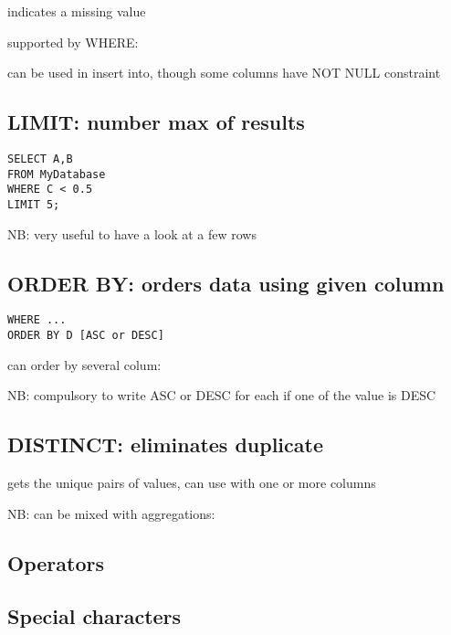 		 indicates a missing value

		supported by WHERE: 

		can be used in insert into, though some  columns have NOT NULL constraint

		\subsection{LIMIT: number max of results}

\begin{lstlisting}
SELECT A,B
FROM MyDatabase
WHERE C < 0.5
LIMIT 5;
\end{lstlisting}

	NB: very useful to have a look at a few rows

	\subsection{ORDER BY: orders data using given column}

\begin{lstlisting}
WHERE ...
ORDER BY D [ASC or DESC]
\end{lstlisting}

		can  order by several colum: 

		NB: compulsory to write ASC  or DESC for each if one of the value is DESC

	\subsection{DISTINCT: eliminates duplicate}

		 gets the unique pairs of values, can use with one or more columns
		
		NB: can be mixed with aggregations: 

	\subsection{Operators}



		\code{=}

		\code{!=}

	\subsection{Special characters}


